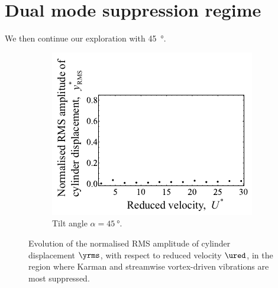 \documentclass[a4paper,fleqn]{cas-sc}
\begin{document}
\section{Dual mode suppression regime}\label{sec:suppRegime}
We then continue our exploration with \SI{45}{\degree}.

\begin{figure}
  \centering
  \begin{subfigure}[h]{0.38\textwidth}
    \includegraphics[width=\textwidth]{figs/yStrRMS3}
    \caption{Tilt angle $\alpha = \SI{45}{\degree}$.}
    \label{fig:yStrRMS3}
  \end{subfigure}
  \caption{Evolution of the normalised RMS amplitude of cylinder displacement $\yrms$, with respect to reduced velocity $\ured$, in the region where Karman and streamwise vortex-driven vibrations are most suppressed.} \label{fig:yStrRMSSuppressed}
\end{figure}
\end{document}
